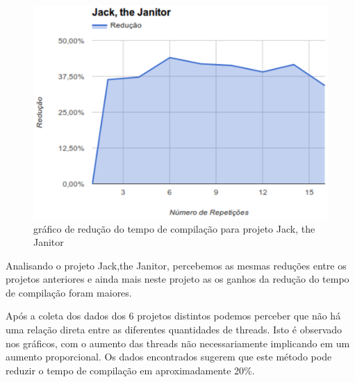 \begin{figure}[h]
    \centering
        \includegraphics[keepaspectratio=true,scale=1]{figuras/jack.eps}
    \caption{gráfico de redução do tempo de compilação para projeto Jack, the Janitor}
    \label{jack}
\end{figure}

Analisando o projeto Jack,the Janitor, percebemos as mesmas
 reduções entre os projetos anteriores e ainda mais
 neste projeto as os ganhos da redução do tempo de
 compilação foram maiores.

Após a coleta dos dados dos 6 projetos distintos podemos
 perceber que não há uma relação direta entre as diferentes
 quantidades de threads. Isto é observado nos gráficos,
 com o aumento das threads não necessariamente implicando
 em um aumento proporcional. Os dados encontrados
 sugerem que este método pode reduzir o tempo de
 compilação em aproximadamente 20\%.














